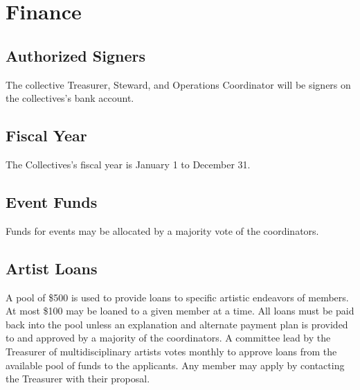 \chapter{Finance}

\section{Authorized Signers}\label{sec:authorized_signers}
The collective Treasurer, Steward, and Operations Coordinator will be signers on the collectives's bank account.

\section{Fiscal Year}\label{sec:fiscal_year}
The Collectives's fiscal year is January 1 to December 31.

\section{Event Funds}\label{sec:event_funds}
Funds for events may be allocated by a majority vote of the coordinators.

\section{Artist Loans}\label{sec:artist_loans}
A pool of \$500 is used to provide loans to specific artistic endeavors of members. At most \$100 may be loaned to a given member at a time. All loans must be paid back into the pool unless an explanation and alternate payment plan is provided to and approved by a majority of the coordinators. A committee lead by the Treasurer of multidisciplinary artists votes monthly to approve loans from the available pool of funds to the applicants. Any member may apply by contacting the Treasurer with their proposal.
